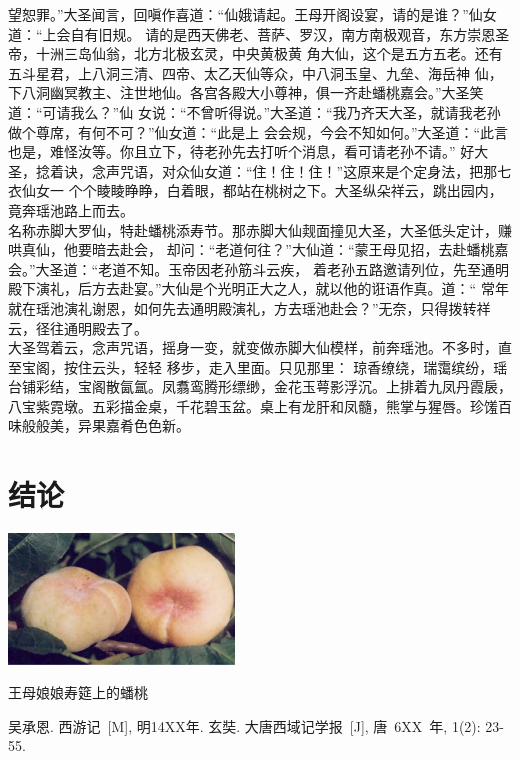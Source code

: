 \documentclass[a4paper,11pt,onecolumn,twoside]{article}
\makeatletter
\newenvironment{figurehere}
  {\def\@captype{figure}}
  {}
\makeatother
\begin{document}
\begin{CJK*}{GBK}{song}
\begin{multicols}{2}
望恕罪。”大圣闻言，回嗔作喜道：“仙娥请起。王母开阁设宴，请的是谁？”仙女道：“上会自有旧规。
请的是西天佛老、菩萨、罗汉，南方南极观音，东方崇恩圣帝，十洲三岛仙翁，北方北极玄灵，中央黄极黄
角大仙，这个是五方五老。还有五斗星君，上八洞三清、四帝、太乙天仙等众，中八洞玉皇、九垒、海岳神
仙，下八洞幽冥教主、注世地仙。各宫各殿大小尊神，俱一齐赴蟠桃嘉会。”大圣笑道：“可请我么？”仙
女说：“不曾听得说。”大圣道：“我乃齐天大圣，就请我老孙做个尊席，有何不可？”仙女道：“此是上
会会规，今会不知如何。”大圣道：“此言也是，难怪汝等。你且立下，待老孙先去打听个消息，看可请老孙不请。”
好大圣，捻着诀，念声咒语，对众仙女道：“住！住！住！”这原来是个定身法，把那七衣仙女一
个个睖睖睁睁，白着眼，都站在桃树之下。大圣纵朵祥云，跳出园内，竟奔瑶池路上而去。\\
\indent 名称赤脚大罗仙，特赴蟠桃添寿节。那赤脚大仙觌面撞见大圣，大圣低头定计，赚哄真仙，他要暗去赴会，
却问：“老道何往？”大仙道：“蒙王母见招，去赴蟠桃嘉会。”大圣道：“老道不知。玉帝因老孙筋斗云疾，
着老孙五路邀请列位，先至通明殿下演礼，后方去赴宴。”大仙是个光明正大之人，就以他的诳语作真。道：“
常年就在瑶池演礼谢恩，如何先去通明殿演礼，方去瑶池赴会？”无奈，只得拨转祥云，径往通明殿去了。\\
\indent 大圣驾着云，念声咒语，摇身一变，就变做赤脚大仙模样，前奔瑶池。不多时，直至宝阁，按住云头，轻轻
移步，走入里面。只见那里：
琼香缭绕，瑞霭缤纷，瑶台铺彩结，宝阁散氤氲。凤翥鸾腾形缥缈，金花玉萼影浮沉。上排着九凤丹霞扆，
八宝紫霓墩。五彩描金桌，千花碧玉盆。桌上有龙肝和凤髓，熊掌与猩唇。珍馐百味般般美，异果嘉肴色色新。
\section{结论}
\begin{figurehere}
\centering
\includegraphics[width=6cm]{Pantao.jpg}
\caption{王母娘娘寿筵上的蟠桃}\label{fig2}
\end{figurehere}
\small
\begin{thebibliography}{99}
\setlength{\parskip}{0pt}  %
吴承恩. 西游记~[M], 明14XX年.
 玄奘. 大唐西域记学报~[J], 唐~6XX~年, 1(2): 23-55.


\end{thebibliography}
\end{multicols}
\end{CJK*}
\end{document}
